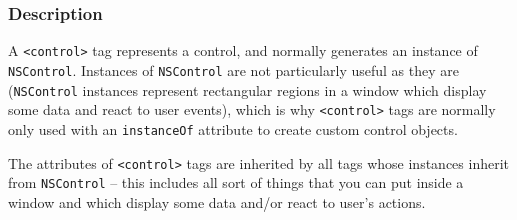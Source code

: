 \subsubsection{Description}

A \texttt{<control>} tag represents a control, and normally generates
an instance of \texttt{NSControl}.  Instances of \texttt{NSControl}
are not particularly useful as they are (\texttt{NSControl} instances
represent rectangular regions in a window which display some data and
react to user events), which is why \texttt{<control>} tags are
normally only used with an \texttt{instanceOf} attribute to create
custom control objects.

The attributes of \texttt{<control>} tags are inherited by all tags
whose instances inherit from \texttt{NSControl} -- this includes all
sort of things that you can put inside a window and which display some
data and/or react to user's actions.

